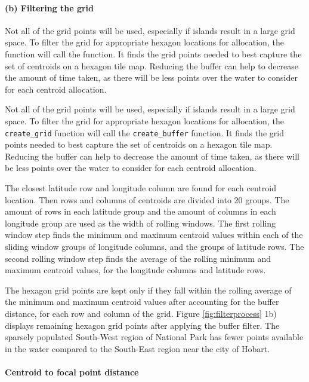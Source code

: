 \hypertarget{b-filtering-the-grid}{%
\paragraph{(b) Filtering the grid}\label{b-filtering-the-grid}}

Not all of the grid points will be used, especially if islands result in
a large grid space. To filter the grid for appropriate hexagon locations
for allocation, the  function will call the
 function. It finds the grid points needed to best
capture the set of centroids on a hexagon tile map. Reducing the buffer
can help to decrease the amount of time taken, as there will be less
points over the water to consider for each centroid allocation.

Not all of the grid points will be used, especially if islands result in
a large grid space. To filter the grid for appropriate hexagon locations
for allocation, the \texttt{create\_grid} function will call the
\texttt{create\_buffer} function. It finds the grid points needed to
best capture the set of centroids on a hexagon tile map. Reducing the
buffer can help to decrease the amount of time taken, as there will be
less points over the water to consider for each centroid allocation.

The closest latitude row and longitude column are found for each
centroid location. Then rows and columns of centroids are divided into
20 groups. The amount of rows in each latitude group and the amount of
columns in each longitude group are used as the width of rolling
windows. The first rolling window step finds the minimum and maximum
centroid values within each of the sliding window groups of longitude
columns, and the groups of latitude rows. The second rolling window step
finds the average of the rolling minimum and maximum centroid values,
for the longitude columns and latitude rows.

The hexagon grid points are kept only if they fall within the rolling
average of the minimum and maximum centroid values after accounting for
the buffer distance, for each row and column of the grid. Figure
\ref{fig:filterprocess} 1b) displays remaining hexagon grid points after
applying the buffer filter. The sparsely populated South-West region of
National Park has fewer points available in the water compared to the
South-East region near the city of Hobart.

\hypertarget{centroid-to-focal-point-distance}{%
\paragraph{Centroid to focal point
distance}\label{centroid-to-focal-point-distance}}

